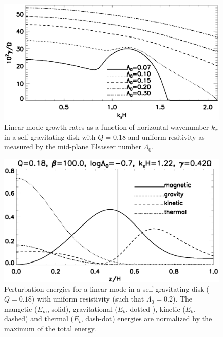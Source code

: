 \begin{figure}
  \includegraphics[width=\linewidth]{figures/compare_growth_varLam}
  \caption{Linear mode growth rates as a function of horizontal wavenumber
    $k_x$ in a self-gravitating disk with $Q=0.18$ and uniform resitivity 
     as measured by the mid-plane Elsasser number $\Lambda_0$.
    \label{compare_growth_varLam}}
\end{figure}


\begin{figure}
  \includegraphics[width=\linewidth]{figures/result_Q0d18_lamda0d2}
  \caption{Perturbation energies for a linear mode in a
    self-gravitating disk ($Q=0.18$) with uniform resistivity (such
    that $\Lambda_0=0.2$). 
    The mangetic
    ($E_m$, solid), gravitational ($E_k$, dotted ), kinetic ($E_k$,
    dashed) and thermal ($E_t$, dash-dot) energies are normalized by
    the maximum of the total energy.  
    \label{result_Q0.18_lambda0.2}}
\end{figure}




